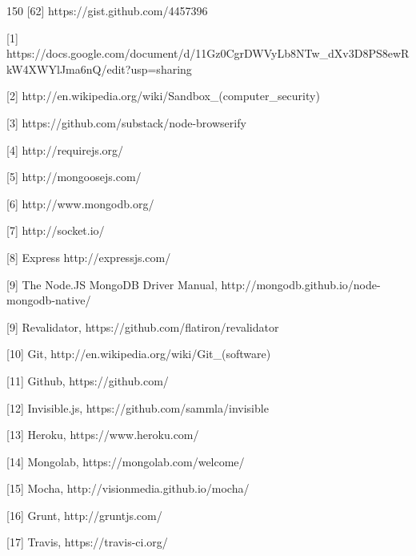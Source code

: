 \documentclass[doc,helv,longtable]{article}
\begin{document}
\begin{thebibliography}{150}
[62] https://gist.github.com/4457396

[1] https://docs.google.com/document/d/11Gz0CgrDWVyLb8NTw_dXv3D8PS8ewRkW4XWYlJma6nQ/edit?usp=sharing

[2] http://en.wikipedia.org/wiki/Sandbox_(computer_security)

[3] https://github.com/substack/node-browserify

[4] http://requirejs.org/

[5] http://mongoosejs.com/

[6] http://www.mongodb.org/

[7] http://socket.io/

[8] Express http://expressjs.com/

[9] The Node.JS MongoDB Driver Manual, http://mongodb.github.io/node-mongodb-native/

[9] Revalidator, https://github.com/flatiron/revalidator

[10] Git, http://en.wikipedia.org/wiki/Git_(software)

[11] Github, https://github.com/

[12] Invisible.js, https://github.com/sammla/invisible

[13] Heroku, https://www.heroku.com/ 

[14] Mongolab, https://mongolab.com/welcome/

[15] Mocha, http://visionmedia.github.io/mocha/ 

[16] Grunt, http://gruntjs.com/

[17] Travis, https://travis-ci.org/

\end{thebibliography}
\end{document}
